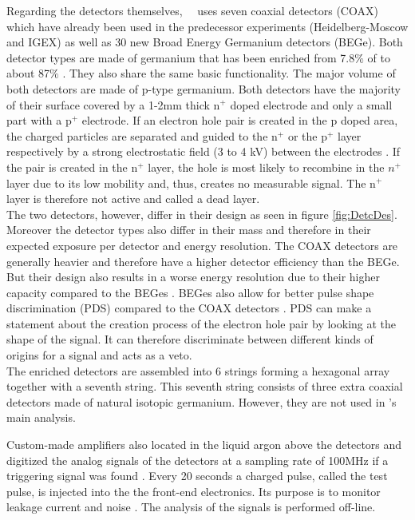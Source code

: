 \documentclass[encoding=utf8,british]{tumphthesis}
\begin{document}
Regarding the detectors themselves, \gerda\ \PII\ uses seven coaxial detectors (COAX) which have already been used in the predecessor experiments (Heidelberg-Moscow and IGEX) as well as 30 new Broad Energy Germanium detectors (BEGe).
Both detector types are made of germanium that has been enriched from 7.8$\%$ of  to about 87$\%$ \cite{agostini_background_2017}.
They also share the same basic functionality.
The major volume of both detectors are made of p-type germanium.
Both detectors have the majority of their surface covered by a 1-2mm thick n$^+$ doped electrode and only a small part with a p$^+$ electrode.
If an electron hole pair is created in the p doped area, the charged particles are separated and guided to the n$^+$ or the p$^+$ layer respectively by a strong electrostatic field (3 to 4 kV) between the electrodes  \cite{spieler_semiconductor_2005}.
If the pair is created in the n$^+$ layer, the hole is most likely to recombine in the $n^+$ layer due to its low mobility and, thus, creates no measurable signal.
The n$^+$ layer is therefore not active and called a dead layer.
\\

The two detectors, however, differ in their design as seen in figure \ref{fig:DetcDes}.
Moreover the detector types also differ in their mass and therefore in their expected exposure per detector and energy resolution.
The COAX detectors are generally heavier and therefore have a higher detector efficiency than the BEGe.
But their design also results in a worse energy resolution due to their higher capacity compared to the BEGes \cite{agostini_production_2015}.
BEGes also allow for better pulse shape discrimination (PDS) compared to the COAX detectors \cite{agostini_pulse_2013}.
PDS can make a statement about the creation process of the electron hole pair by looking at the shape of the signal.
It can therefore discriminate between different kinds of origins for a signal and acts as a veto.
\\

The enriched detectors are assembled into 6 strings forming a hexagonal array together with a seventh string.
This seventh string consists of three extra coaxial detectors made of natural isotopic germanium.
However, they are not used in \gerda's main analysis.

Custom-made amplifiers also located in the liquid argon above the detectors and digitized the analog signals of the detectors at a sampling rate of 100MHz if a triggering signal was found \cite{riboldi_cryogenic_2015}.
Every 20 seconds a charged pulse, called the test pulse, is injected into the the front-end electronics.
Its purpose is to monitor leakage current and noise \cite{agostini_background_2017}.
The analysis of the signals is performed off-line.
\end{document}
